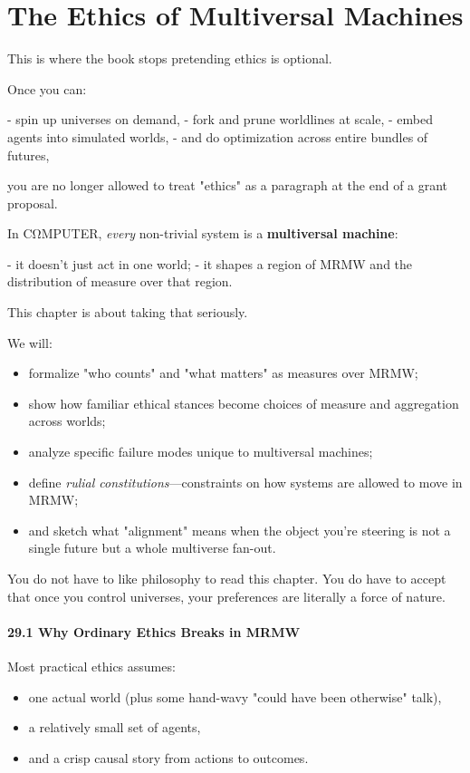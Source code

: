 \chapter{The Ethics of Multiversal Machines}
\label{sec:ethics-multiversal}

This is where the book stops pretending ethics is optional.

Once you can:

- spin up universes on demand,
- fork and prune worldlines at scale,
- embed agents into simulated worlds,
- and do optimization across entire bundles of futures,

you are no longer allowed to treat "ethics" as a paragraph at the end of a grant proposal.

In CΩMPUTER, \emph{every} non-trivial system is a \textbf{multiversal machine}:

- it doesn’t just act in one world;
- it shapes a region of MRMW and the distribution of measure over that region.

This chapter is about taking that seriously.

We will:

\begin{itemize}
  \item formalize "who counts" and "what matters" as measures over MRMW;
  \item show how familiar ethical stances become choices of measure and aggregation across worlds;
  \item analyze specific failure modes unique to multiversal machines;
  \item define \emph{rulial constitutions}—constraints on how systems are allowed to move in MRMW;
  \item and sketch what "alignment" means when the object you’re steering is not a single future but a whole multiverse fan-out.
\end{itemize}

You do not have to like philosophy to read this chapter.
You do have to accept that once you control universes, your preferences are literally a force of nature.

\subsubsection*{29.1  Why Ordinary Ethics Breaks in MRMW}

Most practical ethics assumes:

\begin{itemize}
  \item one actual world (plus some hand-wavy "could have been otherwise" talk),
  \item a relatively small set of agents,
  \item and a crisp causal story from actions to outcomes.
\end{itemize}


